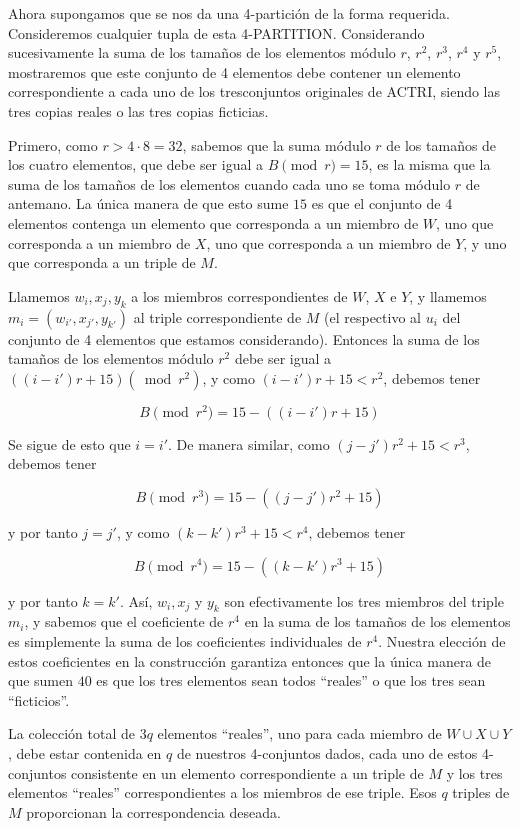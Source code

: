 \documentclass{article}
\begin{document}
Ahora supongamos que se nos da una 4-partición de la forma requerida. Consideremos cualquier tupla de esta 4-PARTITION. Considerando sucesivamente la suma de los tamaños de los elementos módulo $r$, $r^2$, $r^3$, $r^4$ y $r^5$, mostraremos que este conjunto de 4 elementos debe contener un elemento correspondiente a cada uno de los tresconjuntos originales de ACTRI, siendo las tres copias reales o las tres copias ficticias.

Primero, como $r > 4 \cdot 8 = 32$, sabemos que la suma módulo $r$ de los tamaños de los cuatro elementos, que debe ser igual a $B \pmod r = 15$, es la misma que la suma de los tamaños de los elementos cuando cada uno se toma módulo $r$ de antemano. La única manera de que esto sume $15$ es que el conjunto de 4 elementos contenga un elemento que corresponda a un miembro de $W$, uno que corresponda a un miembro de $X$, uno que corresponda a un miembro de $Y$, y uno que corresponda a un triple de $M$.

Llamemos $w_i, x_j, y_k$ a los miembros correspondientes de $W$, $X$ e $Y$, y llamemos $m_{i} = (w_{i'}, x_{j'}, y_{k'})$ al triple correspondiente de $M$ (el respectivo al $u_i$ del conjunto de 4 elementos que estamos considerando). Entonces la suma de los tamaños de los elementos módulo $r^2$ debe ser igual a $((i-i')r + 15) (\bmod r^2)$, y como $(i-i')r + 15 < r^2$, debemos tener

\[
B \pmod {r^2} = 15 - ((i-i')r + 15)
\]

Se sigue de esto que $i=i'$. De manera similar, como $(j-j')r^2 + 15 < r^3$, debemos tener

\[
B \pmod {r^3} = 15 - ((j-j')r^2 + 15)
\]

y por tanto $j=j'$, y como $(k-k')r^3 + 15 < r^4$, debemos tener

\[
B \pmod {r^4} = 15 - ((k-k')r^3 + 15)
\]

y por tanto $k=k'$. Así, $w_i, x_j$ y $y_k$ son efectivamente los tres miembros del triple $m_i$, y sabemos que el coeficiente de $r^4$ en la suma de los tamaños de los elementos es simplemente la suma de los coeficientes individuales de $r^4$. Nuestra elección de estos coeficientes en la construcción garantiza entonces que la única manera de que sumen $40$ es que los tres elementos sean todos ``reales'' o que los tres sean ``ficticios''.

La colección total de $3q$ elementos ``reales'', uno para cada miembro de $W \cup X \cup Y$, debe estar contenida en $q$ de nuestros 4-conjuntos dados, cada uno de estos 4-conjuntos consistente en un elemento correspondiente a un triple de $M$ y los tres elementos ``reales'' correspondientes a los miembros de ese triple. Esos $q$ triples de $M$ proporcionan la correspondencia deseada.
\end{document}
